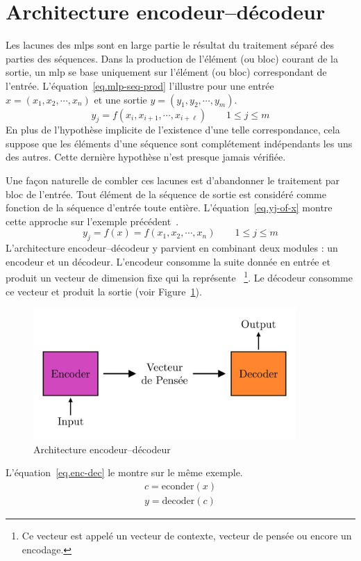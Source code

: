 \section{Architecture encodeur--décodeur}

Les lacunes des \glspl{mlp} sont en large partie le résultat du traitement séparé des parties des séquences.
Dans la production de l'élément (ou bloc) courant de la sortie,
un \gls{mlp} se base uniquement sur l'élément (ou bloc) correspondant de l'entrée.
L'équation~\ref{eq.mlp-seq-prod} l'illustre pour une entrée \(x = (x_1, x_2, \cdots, x_n)\)
et une sortie \(y = (y_1, y_2, \cdots, y_m)\).
\begin{equation}
    \label{eq.mlp-seq-prod}
    y_j = f(x_i, x_{i+1}, \cdots, x_{i+\ell}) \qquad 1 \le j \le m
\end{equation}
En plus de l'hypothèse implicite de l'existence d'une telle correspondance,
cela suppose que les éléments d'une séquence sont complétement indépendants les uns des autres.
Cette dernière hypothèse n'est presque jamais vérifiée. 

Une façon naturelle de combler ces lacunes est d'abandonner le traitement par bloc de l'entrée.
Tout élément de la séquence de sortie est considéré comme fonction de la séquence d'entrée toute entière.
L'équation~\ref{eq.yj-of-x} montre cette approche sur l'exemple précédent~\cite{Stahlberg_2020}.
\begin{equation}
    \label{eq.yj-of-x}
    y_j = f(x) = f(x_1, x_2, \cdots, x_n) \qquad 1 \le j \le m
\end{equation}
L'architecture encodeur--décodeur y parvient en combinant deux modules : un encodeur et un décodeur.
L'encodeur consomme la suite donnée en entrée et produit un vecteur de dimension fixe qui la représente%
~\footnote{Ce vecteur est appelé un vecteur de contexte, vecteur de pensée ou encore un encodage.}.
Le décodeur consomme ce vecteur et produit la sortie (voir Figure~\ref{fig.encoder-decoder}).
\begin{figure}[hbt]
    \centering
    \includegraphics[width=10cm]{assets/images/encoder-decoder.png}
    \caption{Architecture encodeur--décodeur}
    \label{fig.encoder-decoder}
\end{figure}
L'équation~\ref{eq.enc-dec} le montre sur le même exemple.
\begin{equation}
    \label{eq.enc-dec}
    \begin{array}{l}
        c = \mathrm{econder}(x)\\
        y = \mathrm{decoder}(c)
    \end{array}
\end{equation}

